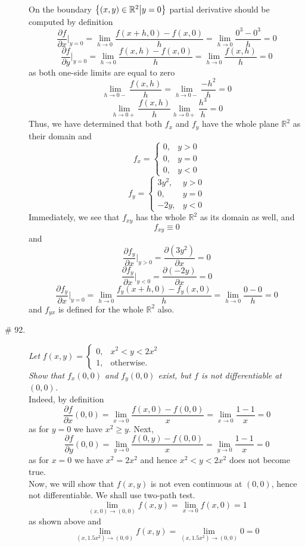 \documentclass[8pt]{article} %
\begin{document}
\begin{description}
{			On the boundary $\left\{(x,y)\in\mathbb{R}^2\big| y=0\right\}$ partial derivative should be computed by definition
			\[\frac{\partial f}{\partial x}\bigg|_{y=0}=\lim_{h\to0}\frac{f(x+h,0)-f(x,0)}{h}=\lim_{h\to 0}\frac{0^3-0^3}
			{h}=0\]
			\[\frac{\partial f}{\partial y}\bigg|_{y=0}=\lim_{h\to0}\frac{f(x,h)-f(x,0)}{h}=\lim_{h\to 0}\frac{f(x,h)}{h
			}=0\]
			as both one-side limits are equal to zero
			\[\lim_{h\to 0-}\frac{f(x,h)}{h}=\lim_{h\to0-}\frac{-h^2}{h}=0\]
			\[\lim_{h\to 0+}\frac{f(x,h)}{h}\lim_{h\to0+}\frac{h^3}{h}=0\]
			Thus, we have determined that both $f_x$ and $f_y$ have the whole plane $\mathbb{R}^2$ as their domain and
			\[f_x=\left\{\begin{array}{ll}0,&y>0\\0,&y=0\\0,&y<0\end{array}\right.\]
			\[f_y=\left\{\begin{array}{ll}3y^2,&y>0\\0,&y=0\\-2y,&y<0\end{array}\right.\]
			Immediately, we see that $f_{xy}$ has the whole $\mathbb{R}^2$ as its domain as well, and
			\[f_{xy}\equiv0\]
			and 
			\[\frac{\partial f_y}{\partial x}\bigg|_{y>0}=\frac{\partial (3y^2)}{\partial x}=0\]
			\[\frac{\partial f_y}{\partial x}\bigg|_{y<0}=\frac{\partial (-2y)}{\partial x}=0\]
			\[\frac{\partial f_y}{\partial x}\bigg|_{y=0}=\lim_{h\to0}\frac{f_y(x+h,0)-f_y(x,0)}{h}=\lim_{h\to 0}
			\frac{0-0}{h}=0\]
			and $f_{yx}$ is defined for the whole $\mathbb{R}^2$ also.
		}
	\item[\# 92.]{{\it Let} $f(x,y)=\left\{\begin{array}{ll}0,&x^2<y<2x^2\\1,&\mbox{otherwise.}\end{array}\right.$\\
			{\it Show that $f_x(0,0)$ and $f_y(0,0)$ exist, but $f$ is not differentiable at $(0,0)$.}\\
			Indeed, by definition
			\[\frac{\partial f}{\partial x}(0,0)=\lim_{x\to0}\frac{f(x,0)-f(0,0)}{x}=\lim_{x\to0}\frac{1-1}{x}=0\]
			as for $y=0$ we have $x^2\geq y$. Next,
			\[\frac{\partial f}{\partial y}(0,0)=\lim_{y\to0}\frac{f(0,y)-f(0,0)}{x}=\lim_{y\to0}\frac{1-1}{x}=0\]
			as for $x=0$ we have $x^2=2x^2$ and hence $x^2<y<2x^2$ does not become true.\\
			Now, we will show that $f(x,y)$ is not even continuous at $(0,0)$, hence not differentiable. We shall use
		 	two-path test.
			\[\lim_{(x,0)\to(0,0)}f(x,y)=\lim_{x\to0}f(x,0)=1\]
			as shown above and
			\[\lim_{(x,1.5x^2)\to(0,0)}f(x,y)=\lim_{(x,1.5x^2)\to(0,0)} 0=0\]
		}
\end{description}
\end{document}
